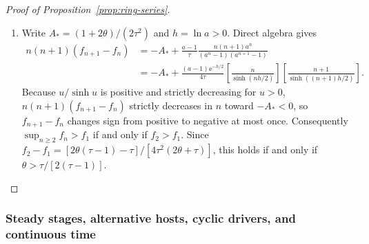 \begin{proof}[Proof of Proposition~{\upshape\ref{prop:ring-series}}]
\begin{enumerate}
\item[(v)] Write $A_* = (1 + 2\theta)/(2\tau^2)$ and $h = \ln a > 0$. Direct algebra gives
\begin{align*}
n(n + 1)(f_{n+1} - f_n) &= -A_* + \frac{a - 1}{\tau}\frac{n(n + 1)a^n}{(a^n - 1)(a^{n+1} - 1)} \\
&= -A_* + \frac{(a - 1)\ee^{-h/2}}{4\tau}\left[\frac{n}{\sinh(nh/2)}\right]\left[\frac{n + 1}{\sinh((n + 1)h/2)}\right].
\end{align*}
Because $u/\sinh u$ is positive and strictly decreasing for $u > 0$, $n(n + 1)(f_{n+1} - f_n)$ strictly decreases in $n$ toward $-A_* < 0$, so $f_{n+1} - f_n$ changes sign from positive to negative at most once. Consequently $\sup_{n \ge 2} f_n > f_1$ if and only if $f_2 > f_1$. Since $f_2 - f_1 = [2\theta(\tau - 1) - \tau]/[4\tau^2(2\theta + \tau)]$, this holds if and only if $\theta > \tau/[2(\tau - 1)]$. \qedhere
\end{enumerate}
\end{proof}

\subsubsection{Steady stages, alternative hosts, cyclic drivers, and continuous time}\label{subsec:app-ring-ext}

